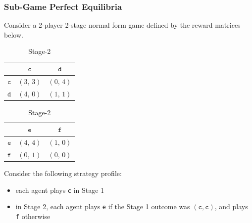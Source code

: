 \subsubsection{Sub-Game Perfect Equilibria}
Consider a 2-player 2-stage normal form game defined by the reward matrices below.
\begin{table}[H]
\begin{minipage}{.5\linewidth}
  \centering
  \begin{tabular}{|c|c|c|}
    \hline
           & $\texttt{c}$        & $\texttt{d}$        \\\hline
    $\texttt{c}$    & $(3,\,3)$  & $(0,\,4)$ \\\hline
    $\texttt{d}$    & $(4,\,0)$ & $(1,\,1)$  \\\hline
  \end{tabular}
  \caption*{Stage-1}
\end{minipage}
\begin{minipage}{.5\linewidth}
  \centering
  \begin{tabular}{|c|c|c|}
    \hline
           & $\texttt{e}$        & $\texttt{f}$        \\\hline
    $\texttt{e}$    & $(4,\,4)$  & $(1,\,0)$ \\\hline
    $\texttt{f}$    & $(0,\,1)$  & $(0,\,0)$  \\\hline
  \end{tabular}
  \caption*{Stage-2}
\end{minipage}
\end{table}
Consider the following strategy profile:
\begin{itemize}
\item each agent plays \texttt{c} in Stage 1
\item in Stage 2, each agent plays \texttt{e} if the Stage 1 outcome was $(\texttt{c}, \texttt{c})$, and plays \texttt{f} otherwise
\end{itemize}

